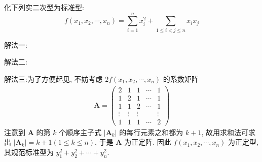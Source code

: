 \documentclass[../../main.tex]{subfiles}
\begin{document}
\begin{example}
化下列实二次型为标准型:
\[f(x_1,x_2,\cdots,x_n)=\sum_{i = 1}^{n}x_i^2+\sum_{1\leq i < j\leq n}x_ix_j\]
\end{example}
\begin{solution}
{\color{blue}解法一:}

{\color{blue}解法二:}

{\color{blue}解法三:}为了方便起见, 不妨考虑 \(2f(x_1,x_2,\cdots,x_n)\) 的系数矩阵
\begin{align*}
\boldsymbol{A} = \begin{pmatrix}
2 & 1 & 1 & \cdots & 1 \\
1 & 2 & 1 & \cdots & 1 \\
1 & 1 & 2 & \cdots & 1 \\
\vdots & \vdots & \vdots & & \vdots \\
1 & 1 & 1 & \cdots & 2
\end{pmatrix}
\end{align*}
注意到 \(\boldsymbol{A}\) 的第 \(k\) 个顺序主子式 \(|\boldsymbol{A}_k|\) 的每行元素之和都为 \(k + 1\), 故用求和法可求出 \(|\boldsymbol{A}_k| = k + 1(1\leq k\leq n)\), 于是 \(\boldsymbol{A}\) 为正定阵. 因此 \(f(x_1,x_2,\cdots,x_n)\) 为正定型, 其规范标准型为 \(y_1^2 + y_2^2 + \cdots + y_n^2\). 
\end{solution}
\end{document}
